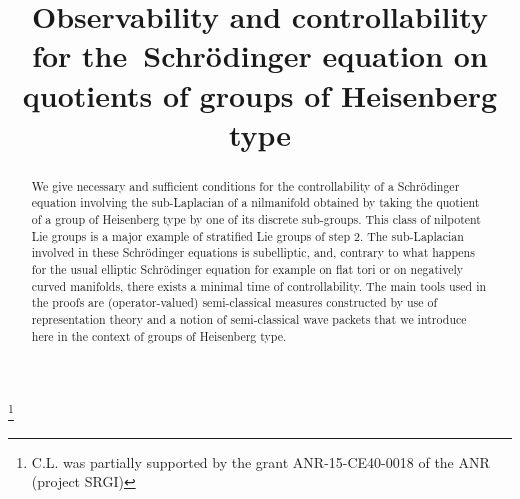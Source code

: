 \documentclass[JEP,XML,SOM,Unicode,published]{cedram}
\theoremstyle{plain}
\theoremstyle{definition}
\begin{document}
\frontmatter

\title[Observability and controllability for the~Schrödinger equation]{Observability and controllability for the~Schrödinger equation on quotients of groups of Heisenberg type}

\author[\initial{C.} \lastname{Fermanian Kammerer}]{ }
\address{Univ Paris Est Creteil, CNRS, LAMA\\
F-94010 Creteil, France}
\address{Univ Gustave Eiffel, LAMA\\
F-77447 Marne-la-Vallée, France}

\author[\initial{C.} \lastname{Letrouit}]{ }
\address{Sorbonne Université, Université Paris-Diderot, CNRS, Inria, LJLL\\
75005 Paris, France}
\address{DMA, École normale supérieure, CNRS, PSL Research University\\
75005 Paris, France}

\thanks{C.L. was partially supported by the grant ANR-15-CE40-0018 of the ANR (project SRGI)}

\begin{abstract}
We give necessary and sufficient conditions for the controllability of a Schrödinger equation involving the sub-Laplacian of a nilmanifold obtained by taking the quotient of a group of Heisenberg type by one of its discrete sub-groups. This class of nilpotent Lie groups is a major example of stratified Lie groups of step 2. The sub-Laplacian involved in these Schrödinger equations is subelliptic, and, contrary to what happens for the usual elliptic Schrödinger equation for example on flat tori or on negatively curved manifolds, there exists a minimal time of controllability. The main tools used in the proofs are (operator-valued) semi-classical measures constructed by use of representation theory and a notion of semi-classical wave packets that we introduce here in the context of groups of Heisenberg type.
\end{abstract}



\end{document}
